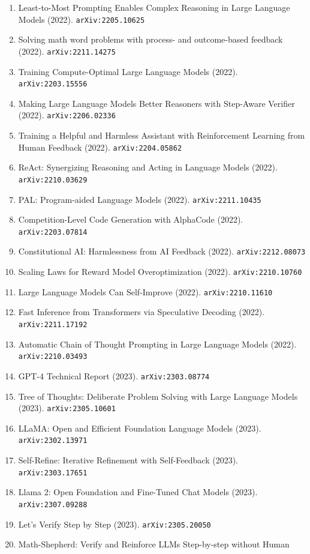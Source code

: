 \documentclass[11pt]{article}
\begin{document}
\begin{enumerate}
  \item Least-to-Most Prompting Enables Complex Reasoning in Large Language
  Models (2022). \texttt{arXiv:2205.10625}
  \item Solving math word problems with process- and outcome-based feedback (2022). \texttt{arXiv:2211.14275}
  \item Training Compute-Optimal Large Language Models (2022). \texttt{arXiv:2203.15556}
  \item Making Large Language Models Better Reasoners with Step-Aware Verifier (2022). \texttt{arXiv:2206.02336}
  \item Training a Helpful and Harmless Assistant with Reinforcement Learning
  from Human Feedback (2022). \texttt{arXiv:2204.05862}
  \item ReAct: Synergizing Reasoning and Acting in Language Models (2022). \texttt{arXiv:2210.03629}
  \item PAL: Program-aided Language Models (2022). \texttt{arXiv:2211.10435}
  \item Competition-Level Code Generation with AlphaCode (2022). \texttt{arXiv:2203.07814}
  \item Constitutional AI: Harmlessness from AI Feedback (2022). \texttt{arXiv:2212.08073}
  \item Scaling Laws for Reward Model Overoptimization (2022). \texttt{arXiv:2210.10760}
  \item Large Language Models Can Self-Improve (2022). \texttt{arXiv:2210.11610}
  \item Fast Inference from Transformers via Speculative Decoding (2022). \texttt{arXiv:2211.17192}
  \item Automatic Chain of Thought Prompting in Large Language Models (2022). \texttt{arXiv:2210.03493}
  \item GPT-4 Technical Report (2023). \texttt{arXiv:2303.08774}
  \item Tree of Thoughts: Deliberate Problem Solving with Large Language Models (2023). \texttt{arXiv:2305.10601}
  \item LLaMA: Open and Efficient Foundation Language Models (2023). \texttt{arXiv:2302.13971}
  \item Self-Refine: Iterative Refinement with Self-Feedback (2023). \texttt{arXiv:2303.17651}
  \item Llama 2: Open Foundation and Fine-Tuned Chat Models (2023). \texttt{arXiv:2307.09288}
  \item Let's Verify Step by Step (2023). \texttt{arXiv:2305.20050}
  \item Math-Shepherd: Verify and Reinforce LLMs Step-by-step without Human

\end{enumerate}
\end{document}
